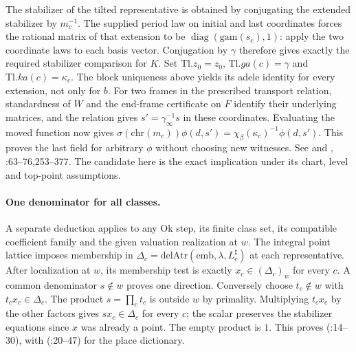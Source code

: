 The stabilizer of the tilted representative is obtained by conjugating
the extended stabilizer by $m_c^{-1}$. The supplied period law on
initial and last coordinates forces the rational matrix of that
extension to be $\operatorname{diag}(\mathrm{gam}(s_c),1)$: apply the
two coordinate laws to each basis vector. Conjugation by $\gamma$
therefore gives exactly the required stabilizer comparison for $K$.
Set $\mathrm{Tl}.z_0=z_0$, $\mathrm{Tl}.ga(c)=\gamma$ and
$\mathrm{Tl}.ka(c)=\kappa_c$. The block uniqueness above yields
its adele identity for every extension, not only for $b$.
For two frames in the prescribed transport relation, standardness
of $W$ and the end-frame certificate on $F$ identify their underlying
matrices, and the relation gives $s'=\gamma_\infty^{-1}s$ in
these coordinates. Evaluating the moved function now gives
$\sigma(\mathrm{chr}(m_c))\phi(d,s')=
\chi_\beta(\kappa_c)^{-1}\phi(d,s')$. This proves the last field for
arbitrary $\phi$ without choosing new witnesses. See
 and ,
:63--76,253--377.
The candidate here is the exact implication  under
its chart, level and top-point assumptions.

\paragraph{One denominator for all classes.}
A separate deduction applies to any $\mathrm{Ok}$ step, its finite
class set, its compatible coefficient family and the given valuation
realization at $w$. The integral point lattice imposes membership in
$\Delta_c=\mathrm{delAtr}(\mathrm{emb},\lambda,L^{\sharp}_c)$
at each representative. After localization at $w$, its membership
test is exactly $x_c\in(\Delta_c)_w$ for every $c$.
A common denominator $s\notin w$ proves one direction. Conversely
choose $t_c\notin w$ with $t_c x_c\in\Delta_c$. The product $s=\prod_c t_c$
is outside $w$ by primality. Multiplying $t_c x_c$ by the other
factors gives $sx_c\in\Delta_c$ for every $c$; the scalar preserves
the stabilizer equations since $x$ was already a point. The empty
product is $1$. This proves 
(:14--30),
with  (:20--47) for the place dictionary.

